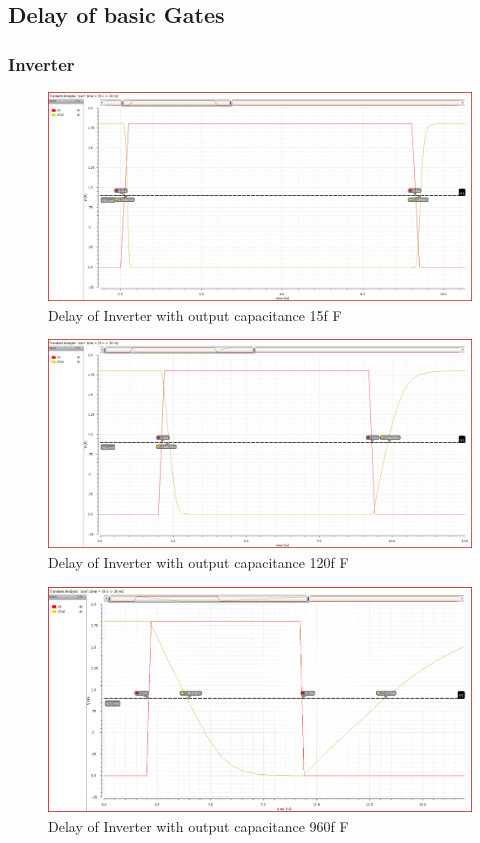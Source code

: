 \documentclass[conference]{IEEEtran}
\begin{document}
\subsection{Delay of basic Gates}

\subsubsection{Inverter}
\begin{figure}[h!]
    \centering
    \includegraphics[width=0.9\linewidth]{inv_C1.png}
    \caption{Delay of Inverter with output capacitance 15f F}
\end{figure}

\begin{figure}[h!]
    \centering
    \includegraphics[width=0.9\linewidth]{inv_C2.png}
    \caption{Delay of Inverter with output capacitance 120f F}
\end{figure}

\begin{figure}[h!]
    \centering
    \includegraphics[width=0.9\linewidth]{inv_C3.png}
    \caption{Delay of Inverter with output capacitance 960f F}
\end{figure}
\end{document}
